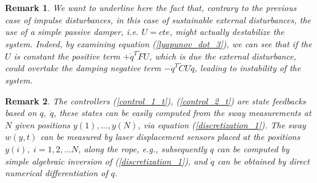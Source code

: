 \documentclass[letterpaper, 11 pt, conference]{ieeeconf}
\newtheorem{remark}{Remark}
\begin{document}
\begin{remark}
We want to underline here the fact that, contrary to the previous
case of impulse disturbances, in this case of sustainable external
disturbances, the use of a simple passive damper, i.e. $U=cte$,
might actually destabilize the system. Indeed, by examining
equation (\ref{lyapunov_dot_3}), we can see that if the $U$ is
constant the positive term $+\dot{q}^{T}\tilde{F}U$, which is due
the external disturbance, could overtake the damping negative term
$-\dot{q}^{T}\tilde{C}U\dot{q}$, leading to instability of the
system.
\end{remark}
\begin{remark}
The controllers (\ref{control_1_t}), (\ref{control_2_t}) are state
feedbacks based on $q,\;\dot{q}$, these states can be easily
computed from the sway measurements at $N$ given positions
$y(1),...,y(N)$, via equation (\ref{discretization_1}). The sway
$w(y,t)$ can be measured by laser displacement sensors placed at
the positions $y(i),\;i=1,2,...N$, along the rope,
e.g.\cite{OYNFN02}, subsequently $q$ can be computed by simple
algebraic inversion of (\ref{discretization_1}), and $\dot{q}$ can
be obtained by direct numerical differentiation of $q$.
\end{remark}
\end{document}
